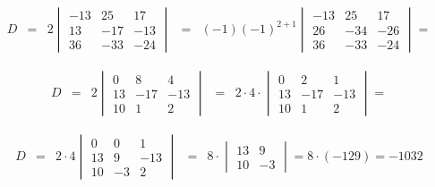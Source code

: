 \documentclass[
]{article}
\begin{document}
\begin{equation*}
\begin{array}{ccccc}
D &= &  2\begin{vmatrix} 
              -13 & 25 & 17 \\ 
               13 &-17 &-13 \\
               36 &-33 &-24 
        \end{vmatrix}
         & = & (-1)(-1)^{2+1}
        \begin{vmatrix} 
              -13 & 25 & 17  \\ 
               26 &-34 &-26  \\
               36 &-33 &-24  
        \end{vmatrix}=
\end{array}
\end{equation*}

\begin{equation*}
\begin{array}{ccccc}
D &= &  2\begin{vmatrix} 
               0  &  8 & 4 \\ 
               13 &-17 &-13 \\
               10 &  1 & 2 
        \end{vmatrix}
         & = & 2\cdot 4\cdot
        \begin{vmatrix} 
               0  & 2  & 1  \\ 
               13 &-17 &-13  \\
               10 & 1  & 2  
        \end{vmatrix}=
\end{array}
\end{equation*}

\begin{equation*}
\begin{array}{ccccc}
D &= & 2\cdot 4 \begin{vmatrix} 
               0  & 0  & 1  \\ 
               13 & 9  &-13  \\
               10 &-3  & 2  
        \end{vmatrix}
         & = & 8\cdot
        \begin{vmatrix} 
               13 & 9    \\ 
               10 &-3 
        \end{vmatrix}= 8\cdot(-129)=-1032
\end{array}
\end{equation*}
\end{document}
